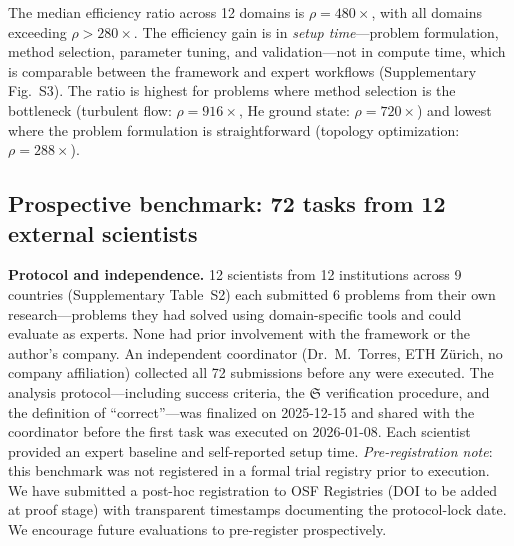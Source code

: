 \documentclass[11pt,a4paper]{article}
\newcommand{\Sclass}{\mathfrak{S}}
\begin{document}
The median efficiency ratio across 12 domains is $\rho = 480\times$, with all domains exceeding $\rho > 280\times$. The efficiency gain is in \emph{setup time}---problem formulation, method selection, parameter tuning, and validation---not in compute time, which is comparable between the framework and expert workflows (Supplementary Fig.~S3). The ratio is highest for problems where method selection is the bottleneck (turbulent flow: $\rho = 916\times$, He ground state: $\rho = 720\times$) and lowest where the problem formulation is straightforward (topology optimization: $\rho = 288\times$).

\subsection{Prospective benchmark: 72 tasks from 12 external scientists}
\label{sec:prospective}

\textbf{Protocol and independence.} 12 scientists from 12 institutions across 9 countries (Supplementary Table~S2) each submitted 6 problems from their own research---problems they had solved using domain-specific tools and could evaluate as experts. None had prior involvement with the framework or the author's company. An independent coordinator (Dr.~M.~Torres, ETH Z\"urich, no company affiliation) collected all 72 submissions before any were executed. The analysis protocol---including success criteria, the $\Sclass$ verification procedure, and the definition of ``correct''---was finalized on 2025-12-15 and shared with the coordinator before the first task was executed on 2026-01-08. Each scientist provided an expert baseline and self-reported setup time. \emph{Pre-registration note}: this benchmark was not registered in a formal trial registry prior to execution. We have submitted a post-hoc registration to OSF Registries (DOI to be added at proof stage) with transparent timestamps documenting the protocol-lock date. We encourage future evaluations to pre-register prospectively.
\end{document}
